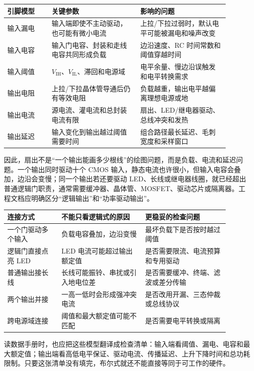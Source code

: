 \begin{longtable}{L{0.18\linewidth}L{0.36\linewidth}L{0.36\linewidth}}
\toprule
引脚模型 & 关键参数 & 影响的问题 \\
\midrule
输入漏电 & 输入端即使不主动驱动，也可能有微小电流 & 上拉/下拉过弱时，默认电平可能被漏电和噪声改变 \\
输入电容 & 输入门电容、封装和走线电容共同形成负载 & 边沿速度、RC 时间常数和阈值穿越时间 \\
输入阈值 & $V_\mathrm{IH}$、$V_\mathrm{IL}$、滞回和电源域 & 电平余量、慢边沿误触发和电平转换需求 \\
输出电阻 & 上拉/下拉晶体管导通后仍有等效电阻 & 负载越重，输出电平越偏离理想电源或地 \\
输出电流 & 源电流、灌电流和总封装电流有限 & 扇出、LED/继电器驱动、总线冲突和发热 \\
输出延迟 & 输入变化到输出越过阈值需要时间 & 组合路径最长延迟、毛刺宽度和采样窗口 \\
\bottomrule
\end{longtable}

因此，扇出不是“一个输出能画多少根线”的绘图问题，而是负载、电流和延迟问题。一个输出同时驱动十个 CMOS 输入，静态电流也许很小，但输入电容会叠加，边沿会变慢；同一个输出若还要驱动 LED、长线或继电器线圈，就已经超出普通逻辑门职责，通常需要缓冲器、晶体管、MOSFET、驱动芯片或隔离器。工程文档应明确区分“逻辑输出”和“功率驱动输出”。

\begin{longtable}{L{0.22\linewidth}L{0.34\linewidth}L{0.34\linewidth}}
\toprule
连接方式 & 不能只看逻辑式的原因 & 更稳妥的检查问题 \\
\midrule
一个门驱动多个输入 & 负载电容叠加，边沿变慢 & 最坏负载下是否按时越过阈值 \\
逻辑门直接点亮 LED & LED 电流可能超过输出额定值 & 是否需要限流、电流预算和专用驱动 \\
普通输出接长线 & 长线可能振铃、串扰或引入地电位差 & 是否需要缓冲、终端、滤波或差分传输 \\
两个输出并接 & 一高一低时会形成强冲突电流 & 是否改用开漏、三态仲裁或总线协议 \\
跨电源域连接 & 阈值和最大额定值可能不匹配 & 是否需要电平转换或隔离 \\
\bottomrule
\end{longtable}

读数据手册时，也应把这些模型翻译成检查清单：输入端看阈值、漏电、电容和最大额定值；输出端看高低电平保证、驱动电流、传播延迟、上升下降时间和总功耗限制。只要这张清单没有填完，布尔式就还不能直接等同于可工作的硬件。

